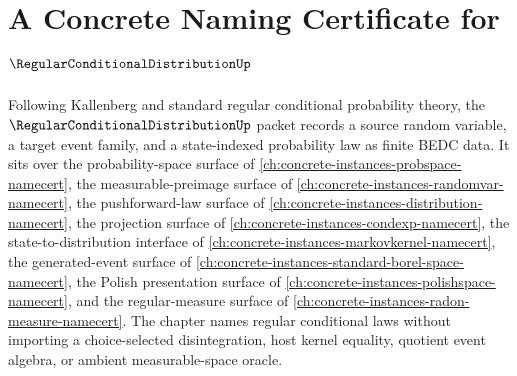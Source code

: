 \chapter{A Concrete Naming Certificate for $\RegularConditionalDistributionUp$}
\label{ch:concrete-instances-regular-conditional-distribution-namecert}

Following Kallenberg and standard regular conditional probability theory, the $\RegularConditionalDistributionUp$ packet records a source random variable, a target event family, and a state-indexed probability law as finite BEDC data. It sits over the probability-space surface of \autoref{ch:concrete-instances-probspace-namecert}, the measurable-preimage surface of \autoref{ch:concrete-instances-randomvar-namecert}, the pushforward-law surface of \autoref{ch:concrete-instances-distribution-namecert}, the projection surface of \autoref{ch:concrete-instances-condexp-namecert}, the state-to-distribution interface of \autoref{ch:concrete-instances-markovkernel-namecert}, the generated-event surface of \autoref{ch:concrete-instances-standard-borel-space-namecert}, the Polish presentation surface of \autoref{ch:concrete-instances-polishspace-namecert}, and the regular-measure surface of \autoref{ch:concrete-instances-radon-measure-namecert}. The chapter names regular conditional laws without importing a choice-selected disintegration, host kernel equality, quotient event algebra, or ambient measurable-space oracle.


